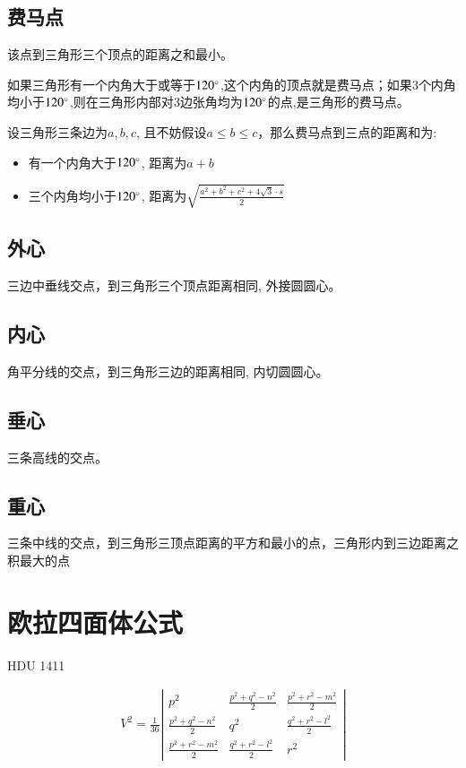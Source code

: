 \subsection{费马点}
该点到三角形三个顶点的距离之和最小。\par
如果三角形有一个内角大于或等于$120\degree$,这个内角的顶点就是费马点；如果$3$个内角均小于$120\degree$,则在三角形内部对$3$边张角均为$120\degree$的点,是三角形的费马点。\par
设三角形三条边为$a, b, c$, 且不妨假设$a \leq b \leq c$，那么费马点到三点的距离和为: 
\begin{itemize}
\item 有一个内角大于$120\degree$, 距离为$a + b$
\item 三个内角均小于$120\degree$, 距离为$\displaystyle \sqrt{\frac{a^2 + b^2 + c^2 + 4\sqrt{3} \cdot s}{2}}$
\end{itemize}


\subsection{外心}
三边中垂线交点，到三角形三个顶点距离相同, 外接圆圆心。

\subsection{内心}
角平分线的交点，到三角形三边的距离相同, 内切圆圆心。


\subsection{垂心}
三条高线的交点。

\subsection{重心}
三条中线的交点，到三角形三顶点距离的平方和最小的点，三角形内到三边距离之积最大的点


\section{欧拉四面体公式}
HDU 1411\par

\begin{eqnarray*}
V^2 = \frac{1}{36}
\left|
\begin{array}{cccc}
p^2 & \frac{p^2 + q^2 - n^2}{2} & \frac{p^2 + r^2 - m^2}{2} \\
\frac{p^2 + q^2 - n^2}{2} & q^2 & \frac{q^2 + r^2 - l^2}{2} \\
\frac{p^2 + r^2 - m^2}{2} & \frac{q^2 + r^2 - l^2}{2} & r^2
\end{array}
\right|
\end{eqnarray*}


